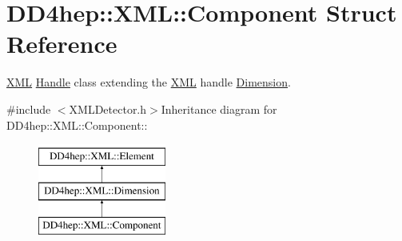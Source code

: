 \hypertarget{struct_d_d4hep_1_1_x_m_l_1_1_component}{
\section{DD4hep::XML::Component Struct Reference}
\label{struct_d_d4hep_1_1_x_m_l_1_1_component}
}


\hyperlink{namespace_d_d4hep_1_1_x_m_l}{XML} \hyperlink{class_d_d4hep_1_1_handle}{Handle} class extending the \hyperlink{namespace_d_d4hep_1_1_x_m_l}{XML} handle \hyperlink{struct_d_d4hep_1_1_x_m_l_1_1_dimension}{Dimension}.  


{\ttfamily \#include $<$XMLDetector.h$>$}Inheritance diagram for DD4hep::XML::Component::\begin{figure}[H]
\begin{center}
\leavevmode
\includegraphics[height=3cm]{struct_d_d4hep_1_1_x_m_l_1_1_component}
\end{center}
\end{figure}
